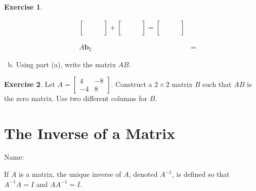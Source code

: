 \documentclass[10pt]{book}
\newcommand{\boxcolor}{gray!30}
\newenvironment{boxdef}{\begin{mdframed}[backgroundcolor=\boxcolor,linewidth=0pt,nobreak=true]}{\end{mdframed}}
\theoremstyle{definition}
\newtheorem{exercise}{Exercise}[section]
\newcommand{\name}[1][2.5in]{\vspace{-2.3em}\hfill Name: \underline{\hspace{#1}}}
\newcommand{\vect}[1]{\ensuremath{\boldsymbol{\mathbf{#1}}}}
\begin{document}
\begin{exercise}
\begin{multicols}{2}
\begin{enumerate}[(a)]
\begin{align*}
			\begin{bmatrix}\phantom{--}\\{}\\{}\\{}\end{bmatrix} +
			\begin{bmatrix}\phantom{--}\\{}\\{}\\{}\end{bmatrix} = \begin{bmatrix}\phantom{--}\\{}\\{}\\{}\end{bmatrix}\\ \\ \\
			A\vect{b}_2 &=
			\end{align*}
			\item Using part (a), write the matrix $AB$.
		\end{enumerate}
	\end{multicols}
\end{exercise}
\vfill


\begin{exercise} %
	Let $A=\begin{bmatrix}4&-8\\-4&8\end{bmatrix}$. Construct a $2\times 2$ matrix $B$ such that $AB$ is the zero matrix. Use two different columns for $B$.
\end{exercise}
\vfill


\newpage


\section{The Inverse of a Matrix}
\name


\begin{boxdef}
	If $A$ is a matrix, the unique inverse of $A$, denoted $A^{-1}$, is defined so that $A^{-1}A=I$ and $AA^{-1}=I$.
\end{boxdef}
\vspace{-1em}
\end{document}
